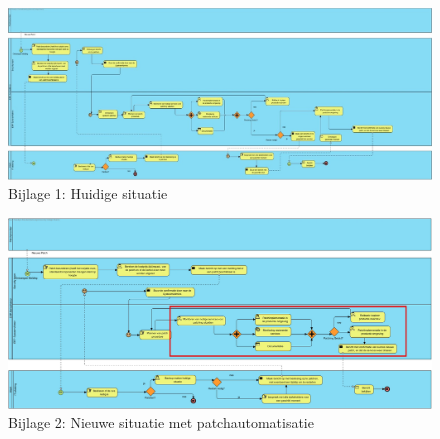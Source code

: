 \documentclass[dutch,dit,thesis]{hogentreport}
\begin{document}
\begin{figure}
    \centering
    \includegraphics[height=\textwidth,angle=270]{huidigesituatie.jpg}
    \caption{Bijlage 1: Huidige situatie}
    \label{fig:huidigesituatie}
\end{figure}

\begin{figure}[htbp]
    \centering
    \includegraphics[height=\textwidth,angle=270]{huidigesituatie2.png}
    \caption{Bijlage 2: Nieuwe situatie met patchautomatisatie}
     \label{fig:huidigesituatie2}
\end{figure}



\backmatter{}

\setlength\bibitemsep{2pt} %
\printbibliography[heading=bibintoc]
\end{document}
